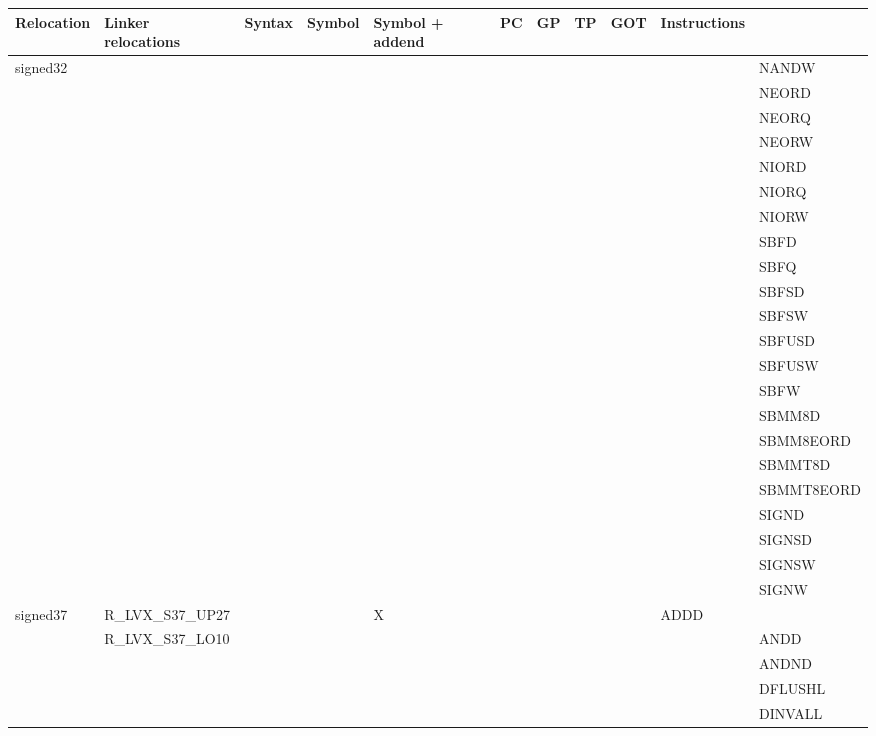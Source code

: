 {\tiny
\begin{tabular}{|l|l|l|l|l|l|l|l|l|l|l|} \hline
\textsf{Relocation} & \textsf{Linker relocations} & \textsf{Syntax} & \textsf{Symbol} & \textsf{Symbol + addend} & \textsf{PC} & \textsf{GP} & \textsf{TP} & \textsf{GOT} & \textsf{Instructions} \\
\hline
\textsf{signed32} & & & & & & & & & & \textsf{NANDW} \\
 & & & & & & & & & & \textsf{NEORD} \\
 & & & & & & & & & & \textsf{NEORQ} \\
 & & & & & & & & & & \textsf{NEORW} \\
 & & & & & & & & & & \textsf{NIORD} \\
 & & & & & & & & & & \textsf{NIORQ} \\
 & & & & & & & & & & \textsf{NIORW} \\
 & & & & & & & & & & \textsf{SBFD} \\
 & & & & & & & & & & \textsf{SBFQ} \\
 & & & & & & & & & & \textsf{SBFSD} \\
 & & & & & & & & & & \textsf{SBFSW} \\
 & & & & & & & & & & \textsf{SBFUSD} \\
 & & & & & & & & & & \textsf{SBFUSW} \\
 & & & & & & & & & & \textsf{SBFW} \\
 & & & & & & & & & & \textsf{SBMM8D} \\
 & & & & & & & & & & \textsf{SBMM8EORD} \\
 & & & & & & & & & & \textsf{SBMMT8D} \\
 & & & & & & & & & & \textsf{SBMMT8EORD} \\
 & & & & & & & & & & \textsf{SIGND} \\
 & & & & & & & & & & \textsf{SIGNSD} \\
 & & & & & & & & & & \textsf{SIGNSW} \\
 & & & & & & & & & & \textsf{SIGNW} \\
\hline
\textsf{signed37} & \textsf{R\_LVX\_S37\_UP27} & \textsf{} & \textsf{} & \textsf{X} & \textsf{} & \textsf{} & \textsf{} & \textsf{} & \textsf{ADDD} \\
 & \textsf{R\_LVX\_S37\_LO10} & & & & & & & & & \textsf{ANDD} \\
 & & & & & & & & & & \textsf{ANDND} \\
 & & & & & & & & & & \textsf{DFLUSHL} \\
 & & & & & & & & & & \textsf{DINVALL} \\

\end{tabular}}
